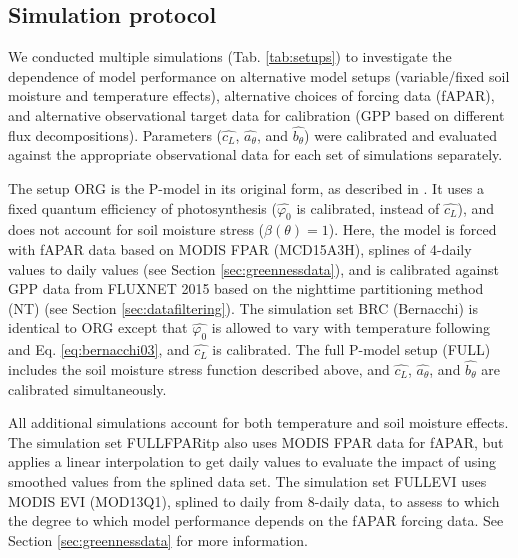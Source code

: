 \documentclass{myreport}
\begin{document}
\subsection{Simulation protocol}
\label{sec:protocol}
We conducted multiple simulations (Tab. \ref{tab:setups}) to investigate the dependence of model performance on alternative model setups (variable/fixed soil moisture and temperature effects), alternative choices of forcing data (fAPAR), and alternative observational target data for calibration (GPP based on different flux decompositions). Parameters ($\widehat{c_L}$, $\widehat{a_{\theta}}$, and $\widehat{b_{\theta}}$) were calibrated and evaluated against the appropriate observational data for each set of simulations separately. 

The setup ORG is the P-model in its original form, as described in \citet{wang17natpl}. It uses a fixed quantum efficiency of photosynthesis ($\widehat{\varphi_0}$ is calibrated, instead of $\widehat{c_L}$), and does not account for soil moisture stress ($\beta (\theta)=1$). Here, the model is forced with fAPAR data based on MODIS FPAR (MCD15A3H), splines of 4-daily values to daily values (see Section \ref{sec:greennessdata}), and is calibrated against GPP data from FLUXNET 2015 based on the nighttime partitioning method (NT) (see Section \ref{sec:datafiltering}). The simulation set BRC (Bernacchi) is identical to ORG except that  $\widehat{\varphi_0}$ is allowed to vary with temperature following \citet{bernacchi03pce} and Eq. \ref{eq:bernacchi03}, and $\widehat{c_L}$ is calibrated. The full P-model setup (FULL) includes the soil moisture stress function described above, and $\widehat{c_L}$, $\widehat{a_{\theta}}$, and $\widehat{b_{\theta}}$ are calibrated simultaneously. 

All additional simulations account for both temperature and soil moisture effects. The simulation set FULL\textunderscore FPARitp also uses MODIS FPAR data for fAPAR, but applies a linear interpolation to get daily values to evaluate the impact of using smoothed values from the splined data set. The simulation set FULL\textunderscore EVI uses MODIS EVI (MOD13Q1), splined to daily from 8-daily data, to assess to which the degree to which model performance depends on the fAPAR forcing data. See Section \ref{sec:greennessdata} for more information.
\end{document}
